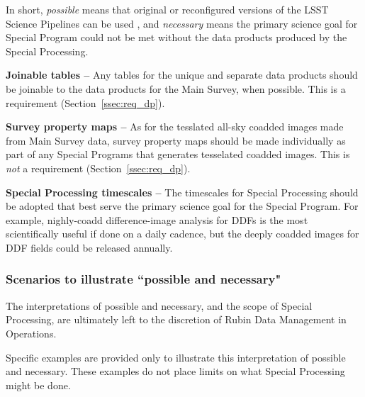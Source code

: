 In short, \emph{possible} means that original or reconfigured versions of the LSST
Science Pipelines can be used , and \emph{necessary} means the primary science goal for Special Program
could not be met without the data products produced by the Special Processing.

\textbf{Joinable tables --}
Any tables for the unique and separate data products should be joinable to the 
data products for the Main Survey, when possible.
This is a requirement (Section~\ref{ssec:req_dp}).

\textbf{Survey property maps --}
As for the tesslated all-sky coadded images made from Main Survey data, survey property maps
should be made individually as part of any Special Programs that generates
tesselated coadded images. This is \emph{not} a requirement (Section~\ref{ssec:req_dp}).

\textbf{Special Processing timescales --}
The timescales for Special Processing should be adopted that best serve the
primary science goal for the Special Program.
For example, nighly-coadd difference-image analysis for DDFs is the most
scientifically useful if done on a daily cadence, but the deeply coadded
images for DDF fields could be released annually.

\subsubsection{Scenarios to illustrate ``possible and necessary"}

The interpretations of possible and necessary, and the scope of Special Processing,
are ultimately left to the discretion of Rubin Data Management in Operations.

Specific examples are provided only to illustrate this interpretation of possible and necessary.
These examples do not place limits on what Special Processing might be done.

